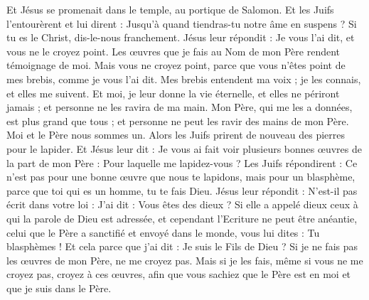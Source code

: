 \begin{multicols}{2}
Et Jésus se promenait dans le temple, au portique de Salomon.
Et les Juifs l'entourèrent et lui dirent : Jusqu'à quand tiendras-tu notre âme en suspens ? Si tu es le Christ, dis-le-nous franchement.
Jésus leur répondit : Je vous l'ai dit, et vous ne le croyez point. Les œuvres que je fais au Nom de mon Père rendent témoignage de moi.
Mais vous ne croyez point, parce que vous n'êtes point de mes brebis, comme je vous l'ai dit.
Mes brebis entendent ma voix ; je les connais, et elles me suivent.
Et moi, je leur donne la vie éternelle, et elles ne périront jamais ; et personne ne les ravira de ma main.
Mon Père, qui me les a données, est plus grand que tous ; et personne ne peut les ravir des mains de mon Père.
Moi et le Père nous sommes un.
Alors les Juifs prirent de nouveau des pierres pour le lapider.
Et Jésus leur dit : Je vous ai fait voir plusieurs bonnes œuvres de la part de mon Père : Pour laquelle me lapidez-vous ?
Les Juifs répondirent : Ce n'est pas pour une bonne œuvre que nous te lapidons, mais pour un blasphème, parce que toi qui es un homme, tu te fais Dieu.
Jésus leur répondit : N'est-il pas écrit dans votre loi : J'ai dit : Vous êtes des dieux ?
Si elle a appelé dieux ceux à qui la parole de Dieu est adressée, et cependant l'Ecriture ne peut être anéantie,
celui que le Père a sanctifié et envoyé dans le monde, vous lui dites : Tu blasphèmes ! Et cela parce que j'ai dit : Je suis le Fils de Dieu ?
Si je ne fais pas les œuvres de mon Père, ne me croyez pas.
Mais si je les fais, même si vous ne me croyez pas, croyez à ces œuvres, afin que vous sachiez que le Père est en moi et que je suis dans le Père.

\end{multicols}
